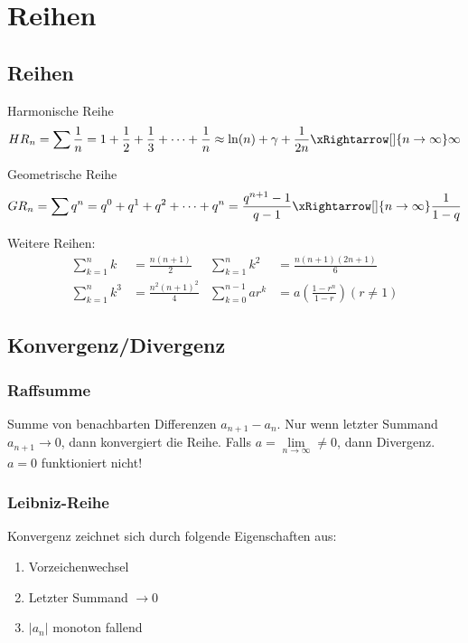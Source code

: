 \section{Reihen}
\subsection{Reihen }
\noindent Harmonische Reihe
\[
HR_n = \sum \frac{1}{n} = 1 + \frac{1}{2} + \frac{1}{3} + \dots + \frac{1}{n} \approx \ln(n) + \gamma + \frac{1}{2n} \xRightarrow[]{n\rightarrow\infty}\infty
\]

\noindent Geometrische Reihe
\[
GR_n = \sum q^n = q^0 + q^1 + q^2 + \cdots + q^n = \frac{q^{n+1}-1}{q-1} \xRightarrow[]{n\rightarrow\infty}\frac{1}{1-q}
\]

\noindent Weitere Reihen:
\begin{align*}
	\sum_{k=1}^n k   &= \frac{n(n+1)}{2} &
	\sum_{k=1}^n k^2 &= \frac{n(n+1)(2n+1)}{6} \\
	\sum_{k=1}^n k^3 &= \frac{n^2(n+1)^2}{4} &
	\sum_{k=0}^{n-1} ar^k &= a\left(\frac{1-r^n}{1-r}\right) (r \neq 1)
\end{align*}



\subsection{Konvergenz/Divergenz}
\subsubsection{Raffsumme}
Summe von benachbarten Differenzen $a_{n+1} - a_n$. Nur wenn letzter Summand $a_{n+1} \rightarrow 0$, dann konvergiert die Reihe.
Falls $a = \lim\limits_{n \rightarrow \infty} \neq 0$, dann Divergenz. $a=0$ funktioniert nicht!

\subsubsection{Leibniz-Reihe}
Konvergenz zeichnet sich durch folgende Eigenschaften aus:
\begin{enumerate}[nosep]
	\item Vorzeichenwechsel
	\item Letzter Summand $\rightarrow 0$
	\item $\left|a_n\right|$ monoton fallend
\end{enumerate}

